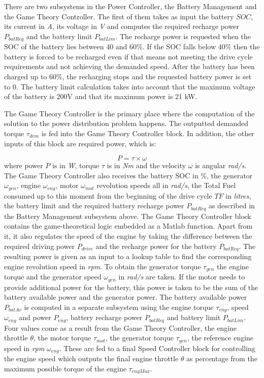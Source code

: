 There are two subsystems in the Power Controller, the Battery Management and the Game Theory Controller. The first of them takes as input the battery $SOC$, its current in \textit{A}, its voltage in \textit{V} and computes the required recharge power $P_{batReq}$ and the battery limit $P_{batLim}$. The recharge power is requested when the SOC of the battery lies between 40 and 60\%. If the SOC falls below 40\% then the battery is forced to be recharged even if that means not meeting the drive cycle requirements and not achieving the demanded speed. After the battery has been charged up to 60\%, the recharging stops and the requested battery power is set to 0. The battery limit calculation takes into account that the maximum voltage of the battery is 200V and that its maximum power is 21 kW.

The Game Theory Controller is the primary place where the computation of the solution to the power distribution problem happens. The outputted demanded torque $\tau_{dem}$ is fed into the Game Theory Controller block. In addition, the other inputs of this block are required power, which is:

\begin{equation}
P = \tau \times \omega
\end{equation}
where power $P$ is in \textit{W}, torque $\tau$ is in \textit{Nm} and the velocity $\omega$ is angular \textit{rad/s}. The Game Theory Controller also receives the battery SOC in \%, the generator $\omega_{gen}$, engine $\omega_{eng}$, motor $\omega_{mot}$ revolution speeds all in \textit{rad/s}, the Total Fuel consumed up to this moment from the beginning of the drive cycle $TF$ in \textit{litres}, the battery limit and the required battery recharge power $P_{batReq}$ as described in the Battery Management subsystem above. The Game Theory Controller block contains the game-theoretical logic embedded as a Matlab function. Apart from it, it also regulates the speed of the engine by taking the difference between the required driving power $P_{drive}$ and the recharge power for the battery $P_{batReq}$. The resulting power is given as an input to a lookup table to find the corresponding engine revolution speed in \textit{rpm}. To obtain the generator torque $\tau_{gen}$ the engine torque and the generator speed $\omega_{gen}$ in \textit{rad/s} are taken. If the motor needs to provide additional power for the battery, this power is taken to be the sum of the battery available power and the generator power. The battery available power $P_{batAv}$ is computed in a separate subsystem using the engine torque $\tau_{eng}$, speed $\omega_{eng}$ and power $P_{eng}$, battery recharge power $P_{batReq}$ and battery limit $P_{batLim}$. 
Four values come as a result from the Game Theory Controller, the engine throttle $\theta$, the motor torque $\tau_{mot}$, the generator torque $\tau_{gen}$, the reference engine speed in \textit{rpm} $\omega_{eng}$. These are fed to a final Speed Controller block for controlling the engine speed which outputs the final engine throttle $\theta$ as percentage from the maximum possible torque of the engine $\tau_{engMax}$.

